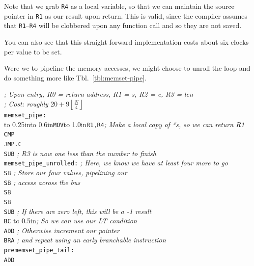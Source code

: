\documentclass{gqtekspec}
\begin{document}
Note that we grab {\tt R4} as a local variable, so that we can maintain the
source pointer in {\tt R1} as our result upon return.  This is valid, since the
compiler assumes that {\tt R1}--{\tt R4} will be clobbered upon any function
call and so they are not saved.

You can also see that this straight forward implementation costs about
six clocks per value to be set.

Were we to pipeline the memory accesses, we might choose to unroll the loop
and do something more like Tbl.~\ref{tbl:memset-pipe}.
\begin{table}\begin{center}
\begin{tabbing}
{\em ; Upon entry, R0 = return address, R1 = s, R2 = c, R3 = len}\\
{\em ; Cost: roughly $20+9\left\lfloor\frac{N}{4}\right\rfloor$}\\
{\tt memset\_pipe:}\\
\hbox to 0.25in{}\=\hbox to 0.6in{\tt MOV}\=\hbox to 1.0in{\tt R1,R4}\={\em ; Make a local copy of *s, so we can return R1}\\
\>	{\tt CMP}\\
\>	{\tt JMP.C}\\
\>	{\tt SUB}\> {\em ; R3 is now one less than the number to finish}\\
{\tt memset\_pipe\_unrolled:}\>\>\> {\em ; Here, we know we have at least four more to go}\\
\>	{\tt SB} \> {\em  ; Store our four values, pipelining our}\\
\>	{\tt SB} \> {\em ; access across the bus }\\
\>	{\tt SB} \\
\>	{\tt SB} \\
\>	{\tt SUB} \> {\em; If there are zero left, this will be a -1 result}\\
\>	{\tt BC}\> \hbox to 0.5in{}\= {\em; So we can use our LT condition}\\
\>	{\tt ADD} \> {\em ; Otherwise increment our pointer}\\
\>	{\tt BRA} {\em ; and repeat using an early branchable instruction}\\
{\tt prememset\_pipe\_tail:} \\
\>    {\tt ADD}\\

\end{tabbing}
\end{center}
\end{table}
\end{document}
